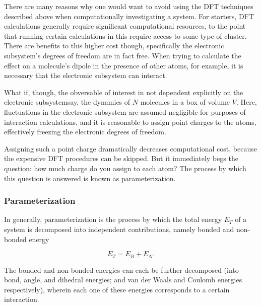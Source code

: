    There are many reasons why one would want to avoid using the DFT techniques described above when computationally investigating a system. For starters, DFT calculations generally require significant computational resources, to the point that running certain calculations in this require access to some type of cluster. There are benefits to this higher cost though, specifically the electronic subsystem's degrees of freedom are in fact free. When trying to calculate the effect on a molecule's dipole in the presence of other atoms, for example, it is necessary that the electronic subsystem can interact.
    
    What if, though, the obversable of interest in not dependent explicitly on the electronic subsystem\textemdash say, the dynamics of $N$ molecules in a box of volume $V$. Here, fluctuations in the electronic subsystem are assumed negligible for purposes of interaction calculations, and it is reasonable to assign point charges to the atoms, effectively freezing the electronic degrees of freedom. 
    
    Assigning such a point charge dramatically decreases computational cost, because the expensive DFT procedures can be skipped. But it immediately begs the question: how much charge do you assign to each atom? The process by which this question is answered is known as parameterization.
    
        \subsubsection{Parameterization}
        
        In generally, parameterization is the process by which the total energy $E_T$ of a system is decomposed into independent contributions, namely bonded and non-bonded energy
        
        \begin{equation}
            E_T = E_B + E_N.
        \end{equation}
        
        \noindent The bonded and non-bonded energies can each be further decomposed (into bond, angle, and dihedral energies; and van der Waals and Coulomb energies respectively), wherein each one of these energies corresponds to a certain interaction.
        
